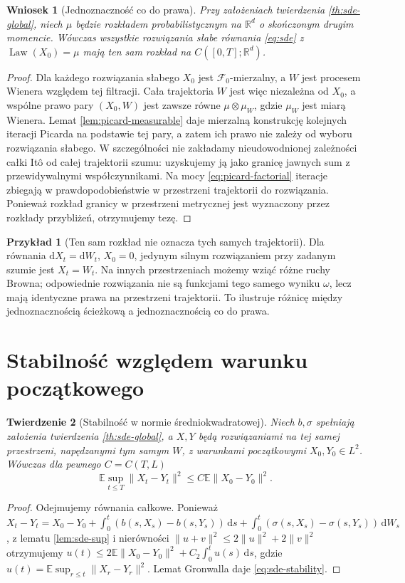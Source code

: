 \documentclass[11pt,a4paper,oneside]{report}
\numberwithin{equation}{chapter}
\theoremstyle{plain}
\newtheorem{twierdzenie}{Twierdzenie}[chapter]
\newtheorem{wniosek}[twierdzenie]{Wniosek}
\theoremstyle{definition}
\newtheorem{przyklad}{Przykład}[chapter]
\theoremstyle{remark}
\newcommand{\R}{\mathbb{R}}
\newcommand{\E}{\mathbb{E}}
\newcommand{\Law}{\operatorname{Law}}
\newcommand{\calF}{\mathcal{F}}
\newcommand{\dd}{\mathrm{d}}
\newcommand{\norm}[1]{\lVert #1\rVert}
\begin{document}
\begin{wniosek}[Jednoznaczność co do prawa]\label{cor:volIII:05:01}
\label{cor:sde-law}
Przy założeniach twierdzenia \ref{th:sde-global},
niech $\mu$ będzie rozkładem probabilistycznym
na $\R^d$ o skończonym drugim momencie.
Wówczas wszystkie rozwiązania słabe równania
\eqref{eq:sde} z $\Law(X_0)=\mu$ mają ten sam
rozkład na $C([0,T];\R^d)$.
\end{wniosek}
\begin{proof}
Dla każdego rozwiązania słabego $X_0$ jest
$\calF_0$-mierzalny, a $W$ jest procesem Wienera
względem tej filtracji. Cała trajektoria $W$
jest więc niezależna od $X_0$, a wspólne prawo pary
$(X_0,W)$ jest zawsze równe
$\mu\otimes\mu_W$, gdzie $\mu_W$ jest miarą Wienera.
Lemat \ref{lem:picard-measurable} daje mierzalną
konstrukcję kolejnych iteracji Picarda na podstawie
tej pary, a zatem ich prawo nie zależy od wyboru
rozwiązania słabego. W szczególności nie zakładamy
nieudowodnionej zależności całki Itô od całej trajektorii
szumu: uzyskujemy ją jako granicę jawnych sum
z przewidywalnymi współczynnikami. Na mocy
\eqref{eq:picard-factorial} iteracje zbiegają w
prawdopodobieństwie w przestrzeni trajektorii
do rozwiązania. Ponieważ rozkład granicy w
przestrzeni metrycznej jest wyznaczony przez rozkłady
przybliżeń, otrzymujemy tezę.
\end{proof}

\begin{przyklad}[Ten sam rozkład nie oznacza tych samych trajektorii]
Dla równania $\dd X_t=\dd W_t$, $X_0=0$,
jedynym silnym rozwiązaniem przy zadanym szumie jest
$X_t=W_t$. Na innych przestrzeniach możemy wziąć
różne ruchy Browna; odpowiednie rozwiązania nie są
funkcjami tego samego wyniku $\omega$, lecz mają
identyczne prawa na przestrzeni trajektorii.
To ilustruje różnicę między jednoznacznością ścieżkową
a jednoznacznością co do prawa.
\end{przyklad}

\section{Stabilność względem warunku początkowego}\label{sec:volIII:05:05}
\begin{twierdzenie}[Stabilność w normie średniokwadratowej]\label{thm:volIII:05:02}
\label{th:sde-stability}
Niech $b,\sigma$ spełniają założenia twierdzenia
\ref{th:sde-global}, a $X,Y$ będą rozwiązaniami
na tej samej przestrzeni, napędzanymi tym samym $W$,
z warunkami początkowymi $X_0,Y_0\in L^2$.
Wówczas dla pewnego $C=C(T,L)$
\[
\E\sup_{t\le T}\norm{X_t-Y_t}^2
\le C\E\norm{X_0-Y_0}^2.
\tag{5.6}\label{eq:sde-stability}
\]
\end{twierdzenie}
\begin{proof}
Odejmujemy równania całkowe. Ponieważ
$X_t-Y_t=X_0-Y_0+\int_0^t(b(s,X_s)-b(s,Y_s))\,\dd s
+\int_0^t(\sigma(s,X_s)-\sigma(s,Y_s))\,\dd W_s$,
z lematu \ref{lem:sde-sup} i nierówności
$\norm{u+v}^2\le2\norm u^2+2\norm v^2$
otrzymujemy
$u(t)\le2\E\norm{X_0-Y_0}^2+C_2\int_0^t u(s)\,\dd s$,
gdzie $u(t)=\E\sup_{r\le t}\norm{X_r-Y_r}^2$.
Lemat Gronwalla daje \eqref{eq:sde-stability}.
\end{proof}
\end{document}
